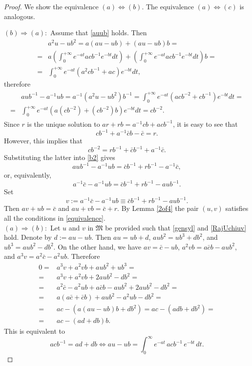 \documentclass[10pt,a4paper]{amsart}
\def\M{\mathfrak{M}}
\begin{document}
\begin{proof} We show the equivalence $(a)\Longleftrightarrow(b)$. The equivalence $(a)\Longleftrightarrow(c)$ is analogous.

$(b)\Rightarrow(a):$ Assume that \eqref{auub} holds. Then
$$\begin{aligned}
&a^2u-ub^2=a(au-ub)+(au-ub)b=\\
=&a\left(\int_0^{+\infty} e^{-at}acb^{-1}e^{-bt}dt\right)+\left(\int_0^{+\infty} e^{-at}acb^{-1}e^{-bt}dt\right)b=\\
=&\int_0^{+\infty}e^{-at}(a^2cb^{-1}+ac)e^{-bt}dt,
\end{aligned}$$
therefore
\begin{eqnarray}
\label{b2}
\begin{aligned}
&aub^{-1}-a^{-1}ub=a^{-1}\left(a^2u-ub^2\right)b^{-1}=\int_0^{+\infty}e^{-at}(acb^{-2}+cb ^{-1})e^{-bt}dt=\\
=&\int_0^{+\infty}e^{-at}\left(a\left(cb^{-2}\right)+\left(cb ^{-2}\right)b\right)e^{-bt}dt=cb^{-2}.\end{aligned}\end{eqnarray}
Since $r$ is the unique solution to $ar+rb=a^{-1}cb+acb^{-1}$, it is easy to see that
$$cb^{-1}+a^{-1}\bar{c}b-\bar{c}=r.$$
However, this implies that 
$$cb^{-2}=rb^{-1}+\bar{c}b^{-1}+a^{-1}\bar{c}.$$
Substituting the latter into \eqref{b2} gives
\begin{equation}
\label{invdiff}
aub^{-1}-a^{-1}ub=\bar{c}b^{-1}+rb^{-1}-a^{-1}\bar{c},\end{equation}
or, equivalently,
$$a^{-1}\bar{c}-a^{-1}ub=\bar{c}b^{-1}+rb^{-1}-aub^{-1}.$$
Set 
$$v:=a^{-1}\bar{c}-a^{-1}ub\equiv \bar{c}b^{-1}+rb^{-1}-aub^{-1}.$$ 
Then $av+ub=\bar{c}$ and $au+vb=\bar{c}+r$. By Lemma \ref{2of4} the pair $(u,v)$ satisfies all the conditions in \eqref{equivalence}.\\


$(a)\Rightarrow(b):$ Let $u$ and $v$ in $\M$ be provided such that \eqref{gensyl} and \eqref{RajUchiuv} hold. Denote by   $d:=au - ub$. Then $au = ub + d$, $aub^2 = ub^3 + db^2$, and $ub^3 = aub^2 - db^2$.
On the other hand, we have $av = \bar{c} - ub$, $
a^2 vb = a\bar{c}b - aub^2$, and $a^3 v = a^2 \bar{c} - a^2 ub$. Therefore
$$\begin{aligned}
0=&a^3 v + a^2 vb + aub^2 + ub^3
=\\
=&a^3 v + a^2 vb + 2aub^2 - db^2
=\\
=&a^2 \bar{c} - a^2 ub + a\bar{c}b - aub^2 + 2aub^2 - db^2=\\
=&a(a\bar{c} + \bar{c}b) + aub^2 - a^2 ub - db^2=\\
=&ac - \left(a(au - ub)b + db^2\right)=ac -\left(adb + db^2\right)=\\
=&ac - (ad + db)b.
\end{aligned}
$$
This is equivalent to
\[
acb^{-1} = ad + db
\Longleftrightarrow
au - ub = \int_0^\infty e^{-at}\, a c b^{-1}\, e^{-bt}\, dt.
\] 
\end{proof}
\end{document}

